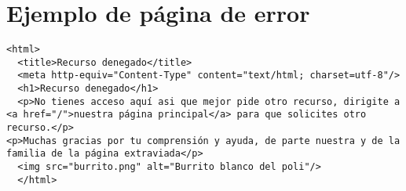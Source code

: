\renewcommand{\appendixname}{Anexos}
\renewcommand{\appendixtocname}{Anexos}
\renewcommand{\appendixpagename}{Anexos}
\pagebreak

\pagestyle{empty}
\pagestyle{plain}

\appendix
\addappheadtotoc
\appendixpage


\section{Ejemplo de página de error}


\begin{lstlisting}[breaklines,frame=single,style=HTMLStyle]
 <html>
  <title>Recurso denegado</title>
  <meta http-equiv="Content-Type" content="text/html; charset=utf-8"/>
  <h1>Recurso denegado</h1>
  <p>No tienes acceso aquí asi que mejor pide otro recurso, dirigite a <a href="/">nuestra página principal</a> para que solicites otro recurso.</p> 
<p>Muchas gracias por tu comprensión y ayuda, de parte nuestra y de la familia de la página extraviada</p>
  <img src="burrito.png" alt="Burrito blanco del poli"/>
  </html>
\end{lstlisting}   
